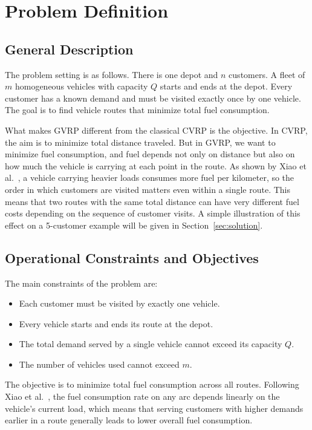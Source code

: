 \documentclass [a4paper, 11pt, titlepage] {article}
\begin{document}
\section{Problem Definition}
\label{sec:problem}

\subsection{General Description}

The problem setting is as follows. There is one depot and $n$ customers. A fleet of $m$ homogeneous vehicles with capacity $Q$ starts and ends at the depot. Every customer has a known demand and must be visited exactly once by one vehicle. The goal is to find vehicle routes that minimize total fuel consumption.

What makes GVRP different from the classical CVRP is the objective. In CVRP, the aim is to minimize total distance traveled. But in GVRP, we want to minimize fuel consumption, and fuel depends not only on distance but also on how much the vehicle is carrying at each point in the route. As shown by Xiao et al.\ \cite{xiao2012}, a vehicle carrying heavier loads consumes more fuel per kilometer, so the order in which customers are visited matters even within a single route. This means that two routes with the same total distance can have very different fuel costs depending on the sequence of customer visits. A simple illustration of this effect on a 5-customer example will be given in Section~\ref{sec:solution}.

\subsection{Operational Constraints and Objectives}

The main constraints of the problem are:

\begin{itemize}
    \item Each customer must be visited by exactly one vehicle.
    \item Every vehicle starts and ends its route at the depot.
    \item The total demand served by a single vehicle cannot exceed its capacity $Q$.
    \item The number of vehicles used cannot exceed $m$.
\end{itemize}

The objective is to minimize total fuel consumption across all routes. Following Xiao et al.\ \cite{xiao2012}, the fuel consumption rate on any arc depends linearly on the vehicle's current load, which means that serving customers with higher demands earlier in a route generally leads to lower overall fuel consumption.
\end{document}
